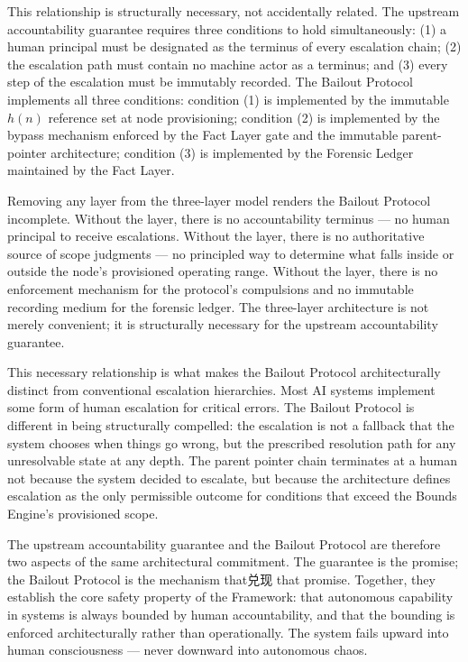 This relationship is structurally necessary, not accidentally related. The upstream accountability guarantee requires three conditions to hold simultaneously: (1) a human principal must be designated as the terminus of every escalation chain; (2) the escalation path must contain no machine actor as a terminus; and (3) every step of the escalation must be immutably recorded. The Bailout Protocol implements all three conditions: condition (1) is implemented by the immutable $h(n)$ reference set at node provisioning; condition (2) is implemented by the bypass mechanism enforced by the Fact Layer gate and the immutable parent-pointer architecture; condition (3) is implemented by the Forensic Ledger maintained by the Fact Layer.

Removing any layer from the \bxthree{} three-layer model renders the Bailout Protocol incomplete. Without the \purpose{} layer, there is no accountability terminus --- no human principal to receive escalations. Without the \bounds{} layer, there is no authoritative source of scope judgments --- no principled way to determine what falls inside or outside the node's provisioned operating range. Without the \fact{} layer, there is no enforcement mechanism for the protocol's compulsions and no immutable recording medium for the forensic ledger. The three-layer architecture is not merely convenient; it is structurally necessary for the upstream accountability guarantee.

This necessary relationship is what makes the Bailout Protocol architecturally distinct from conventional escalation hierarchies. Most AI systems implement some form of human escalation for critical errors. The Bailout Protocol is different in being structurally compelled: the escalation is not a fallback that the system chooses when things go wrong, but the prescribed resolution path for any unresolvable state at any depth. The parent pointer chain terminates at a human not because the system decided to escalate, but because the architecture defines escalation as the only permissible outcome for conditions that exceed the Bounds Engine's provisioned scope.

The upstream accountability guarantee and the Bailout Protocol are therefore two aspects of the same architectural commitment. The guarantee is the promise; the Bailout Protocol is the mechanism that兑现 that promise. Together, they establish the core safety property of the \bxthree{} Framework: that autonomous capability in \bxthree{} systems is always bounded by human accountability, and that the bounding is enforced architecturally rather than operationally. The system fails upward into human consciousness --- never downward into autonomous chaos.